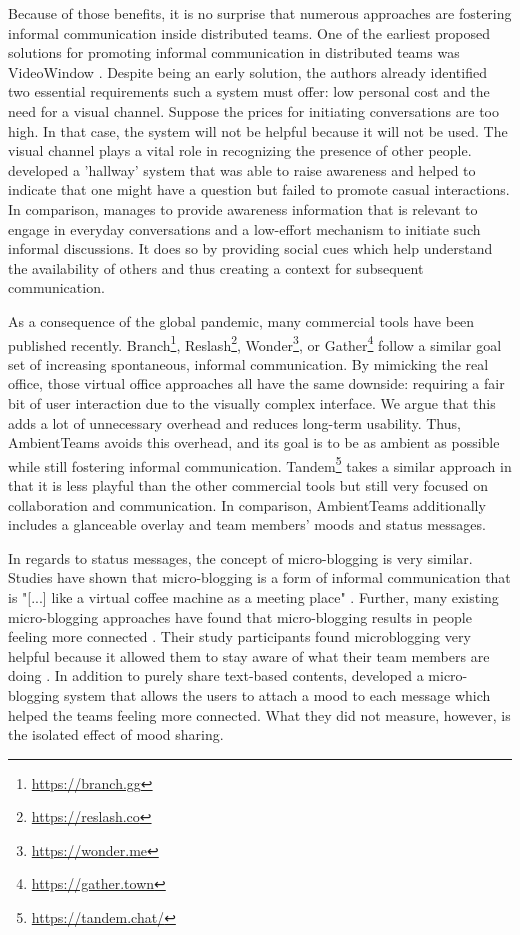 Because of those benefits, it is no surprise that numerous approaches are fostering informal communication inside distributed teams. One of the earliest proposed solutions for promoting informal communication in distributed teams was VideoWindow \autocite{fish1990videowindow}. Despite being an early solution, the authors already identified two essential requirements such a system must offer: low personal cost and the need for a visual channel. Suppose the prices for initiating conversations are too high. In that case, the system will not be helpful because it will not be used. The visual channel plays a vital role in recognizing the presence of other people. \textcite{sasaki1999video} developed a 'hallway' system that was able to raise awareness and helped to indicate that one might have a question but failed to promote casual interactions. In comparison, \textcite{lou2012presencescape} manages to provide awareness information that is relevant to engage in everyday conversations and a low-effort mechanism to initiate such informal discussions. It does so by providing social cues which help understand the availability of others and thus creating a context for subsequent communication.

As a consequence of the global pandemic, many commercial tools have been published recently. Branch\footnote{\url{https://branch.gg}}, Reslash\footnote{\url{https://reslash.co}}, Wonder\footnote{\url{https://wonder.me}}, or Gather\footnote{\url{https://gather.town}} follow a similar goal set of increasing spontaneous, informal communication. By mimicking the real office, those virtual office approaches all have the same downside: requiring a fair bit of user interaction due to the visually complex interface. We argue that this adds a lot of unnecessary overhead and reduces long-term usability. Thus, AmbientTeams avoids this overhead, and its goal is to be as ambient as possible while still fostering informal communication. Tandem\footnote{\url{https://tandem.chat/}} takes a similar approach in that it is less playful than the other commercial tools but still very focused on collaboration and communication. In comparison, AmbientTeams additionally includes a glanceable overlay and team members' moods and status messages.

In regards to status messages, the concept of micro-blogging is very similar. Studies have shown that micro-blogging is a form of informal communication \autocite{ehrlich2010microblogging} that is "[...] like a virtual coffee machine as a meeting place" \autocite{ebner2008microblogging}. Further, many existing micro-blogging approaches have found that micro-blogging results in people feeling more connected \autocite{ehrlich2010microblogging, zhang2010case}. Their study participants found microblogging very helpful because it allowed them to stay aware of what their team members are doing \autocite{zhang2010case}. In addition to purely share text-based contents, \textcite{dullemond2013fixing} developed a micro-blogging system that allows the users to attach a mood to each message which helped the teams feeling more connected. What they did not measure, however, is the isolated effect of mood sharing.

